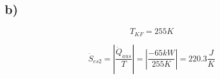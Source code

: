 

\subsection*{b)}
\[
T_{KF} = 255 K
\]

\[
\dot{S}_{es2} = \left| \frac{\dot{Q}_{aus}}{T} \right| = \left| \frac{-65 kW}{255 K} \right| = 220.3 \frac{J}{K}
\]